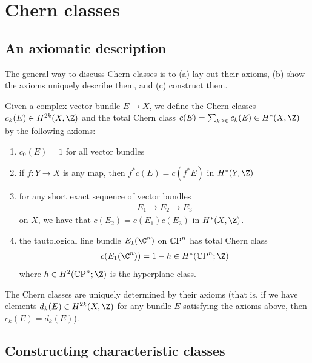 \documentclass[11pt]{book}
\begin{document}
\section{Chern classes}

\subsection{An axiomatic description}

The general way to discuss Chern classes is to (a) lay out their axioms, (b) show the axioms uniquely describe them, and (c) construct them.

\begin{definition}\label{def:chern-classes} Given a complex vector bundle $E \to X$, we define the Chern classes $c_k(E) \in H^{2k}(X,\Z)$ and the total Chern class $c(E) = \sum_{k\ge0} c_k(E) \in H^\ast(X,\Z)$ by the following axioms:
\begin{enumerate}
    \item $c_0(E) = 1$ for all vector bundles
    \item if $f \colon Y \to X$ is any map, then $f^\ast c(E) = c(f^\ast E)$ in $H^\ast(Y,\Z)$
    \item for any short exact sequence of vector bundles
    \begin{align*}
        E_1 \to E_2\to E_3
    \end{align*}
    on $X$, we have that $c(E_2) = c(E_1)c(E_3)$ in $H^\ast(X,\Z)$.
    \item the tautological line bundle $E_1(\C^n)$ on ${\mathbb{C}\text{P}}^n$ has total Chern class
    \begin{align*}
        c(E_1(\C^n)) = 1 -h \in H^\ast(\CP^n;\Z)
    \end{align*}
    where $h \in H^2(\CP^n;\Z)$ is the hyperplane class.
\end{enumerate}
\end{definition}

\begin{proposition}
The Chern classes are uniquely determined by their axioms (that is, if we have elements $d_k(E) \in H^{2k}(X,\Z)$ for any bundle $E$ satisfying the axioms above, then $c_k(E) = d_k(E)$).
\end{proposition}


\subsection{Constructing characteristic classes}
\end{document}
